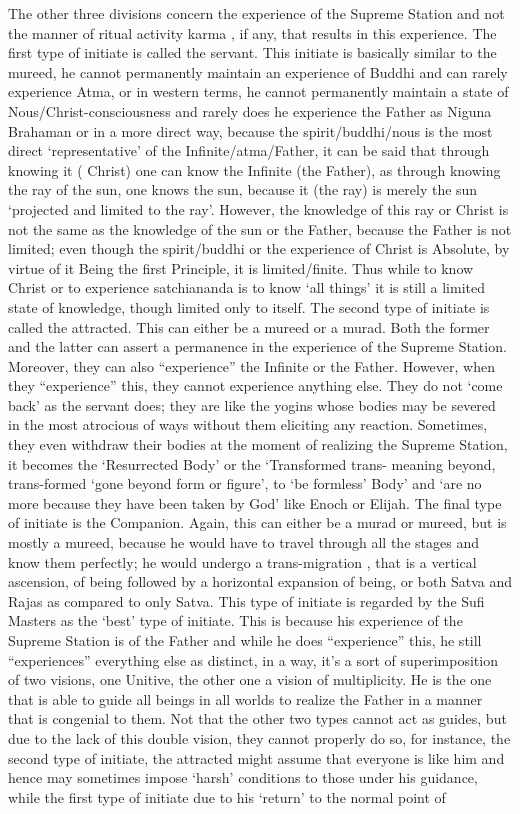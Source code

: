 \begin{footnotesize}
\begin{sffamily}
The other three divisions concern the experience of the Supreme Station and not the manner of ritual activity karma , if any, that results in this experience. The first type of initiate is called the servant. This initiate is basically similar to the mureed, he cannot permanently maintain an experience of Buddhi and can rarely experience Atma, or in western terms, he cannot permanently maintain a state of Nous/Christ-consciousness and rarely does he experience the Father as Niguna Brahaman or in a more direct way, because the spirit/buddhi/nous is the most direct `representative' of the Infinite/atma/Father, it can be said that through knowing it ( Christ) one can know the Infinite (the Father), as through knowing the ray of the sun, one knows the sun, because it (the ray) is merely the sun `projected and limited to the ray'. However, the knowledge of this ray or Christ is not the same as the knowledge of the sun or the Father, because the Father is not limited; even though the spirit/buddhi or the experience of Christ is Absolute, by virtue of it Being the first Principle, it is limited/finite. Thus while to know Christ or to experience satchiananda is to know `all things' it is still a limited state of knowledge, though limited only to itself. The second type of initiate is called the attracted. This can either be a mureed or a murad. Both the former and the latter can assert a permanence in the experience of the Supreme Station. Moreover, they can also ``experience'' the Infinite or the Father. However, when they ``experience'' this, they cannot experience anything else. They do not `come back' as the servant does; they are like the yogins whose bodies may be severed in the most atrocious of ways without them eliciting any reaction. Sometimes, they even withdraw their bodies at the moment of realizing the Supreme Station, it becomes the `Resurrected Body' or the `Transformed trans- meaning beyond, trans-formed `gone beyond form or figure', to `be formless' Body' and `are no more because they have been taken by God' like Enoch or Elijah. The final type of initiate is the Companion. Again, this can either be a murad or mureed, but is mostly a mureed, because he would have to travel through all the stages and know them perfectly; he would undergo a trans-migration , that is a vertical ascension, of being followed by a horizontal expansion of being, or both Satva and Rajas as compared to only Satva. This type of initiate is regarded by the Sufi Masters as the `best' type of initiate. This is because his experience of the Supreme Station is of the Father and while he does ``experience'' this, he still ``experiences'' everything else as distinct, in a way, it's a sort of superimposition of two visions, one Unitive, the other one a vision of multiplicity. He is the one that is able to guide all beings in all worlds to realize the Father in a manner that is congenial to them. Not that the other two types cannot act as guides, but due to the lack of this double vision, they cannot properly do so, for instance, the second type of initiate, the attracted might assume that everyone is like him and hence may sometimes impose `harsh' conditions to those under his guidance, while the first type of initiate due to his `return' to the normal point of 
\end{sffamily}
\end{footnotesize}
